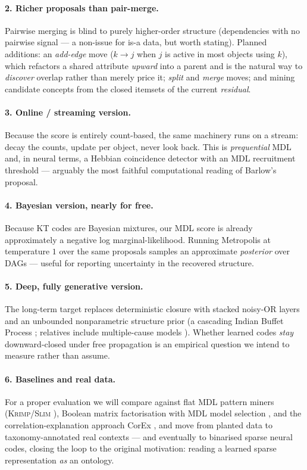 \documentclass[11pt]{article}
\begin{document}
\paragraph{2. Richer proposals than pair-merge.} Pairwise merging is blind to
purely higher-order structure (dependencies with no pairwise signal --- a
non-issue for is-a data, but worth stating). Planned additions: an
\emph{add-edge} move ($k\to j$ when $j$ is active in most objects using $k$),
which refactors a shared attribute \emph{upward} into a parent and is the natural
way to \emph{discover} overlap rather than merely price it; \emph{split} and
\emph{merge} moves; and mining candidate concepts from the closed itemsets of the
current \emph{residual}.

\paragraph{3. Online / streaming version.} Because the score is entirely
count-based, the same machinery runs on a stream: decay the counts, update per
object, never look back. This is \emph{prequential} MDL \cite{dawid1984} and, in
neural terms, a Hebbian coincidence detector with an MDL recruitment threshold
--- arguably the most faithful computational reading of Barlow's proposal.

\paragraph{4. Bayesian version, nearly for free.} Because KT codes are Bayesian
mixtures, our MDL score is already approximately a negative log
marginal-likelihood. Running Metropolis at temperature $1$ over the same
proposals samples an approximate \emph{posterior} over DAGs --- useful for
reporting uncertainty in the recovered structure.

\paragraph{5. Deep, fully generative version.} The long-term target replaces
deterministic closure with stacked noisy-OR layers and an unbounded
nonparametric structure prior (a cascading Indian Buffet Process
\cite{adams2010}; relatives include multiple-cause models \cite{saund1995}).
Whether learned codes \emph{stay} downward-closed under free propagation is an
empirical question we intend to measure rather than assume.

\paragraph{6. Baselines and real data.} For a proper evaluation we will compare
against flat MDL pattern miners (\textsc{Krimp}/\textsc{Slim}
\cite{vreeken2011,smets2012}), Boolean matrix factorisation with MDL model
selection \cite{miettinen2008,miettinen2011}, and the correlation-explanation
approach CorEx \cite{versteeg2014}, and move from planted data to
taxonomy-annotated real contexts --- and eventually to binarised sparse neural
codes, closing the loop to the original motivation: reading a learned sparse
representation \emph{as} an ontology.
\end{document}
